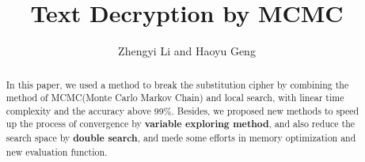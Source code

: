 \documentclass{acmtog} %
\begin{document}

\title{Text Decryption by MCMC} %

\author{Zhengyi Li {\upshape and} Haoyu Geng
}






\maketitle

\begin{abstract}
    In this paper, we used a method to break the substitution cipher by combining the method of MCMC(Monte Carlo Markov Chain) and local search, with linear time complexity and the accuracy above 99\%. Besides, we proposed new methods to speed up the process of convergence by \textbf{variable exploring method}, and also reduce the search space by \textbf{double search}, and mede some efforts in memory optimization and new evaluation function.
\end{abstract}
\tableofcontents

\newpage

\end{document}

